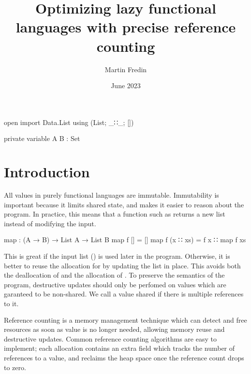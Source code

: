 \documentclass{article}
\title{Optimizing lazy functional languages with precise reference counting}
\author{Martin Fredin}
\date{June 2023}
\begin{document}
\maketitle

\begin{code}[hide]
open import Data.List using (List; _∷_; [])

private 
  variable
    A B : Set

\end{code}

\section{Introduction}

All values in purely functional languages are immutable.
Immutability is important because it limits shared state, and makes it easier to reason about the program.
In practice, this means that a function such as  returns a new list instead of modifying the input.
\begin{code}
map : (A → B) → List A → List B
map f []       = []
map f (x ∷ xs) = f x ∷ map f xs
\end{code}
This is great if the input list (\AgdaSpace{}) is used later in the program. 
Otherwise, it is better to reuse the allocation for \AgdaSpace{} by updating the list in place. 
This avoids both the deallocation of \AgdaSpace{} and the allocation of \AgdaSpace{}.
To preserve the semantics of the program, destructive updates should only be perfomed on values which are garanteed to be non-shared. 
We call a value shared if there is multiple references to it.

Reference counting \citep{collins1960} is a memory management technique which can detect and free resources as soon as value is no longer needed, allowing memory reuse and destructive updates. 
Common reference counting algorithms are easy to implement; each allocation contains an extra field which tracks the number of references to a value, and reclaims the heap space once the reference count drops to zero. 



\end{document}
